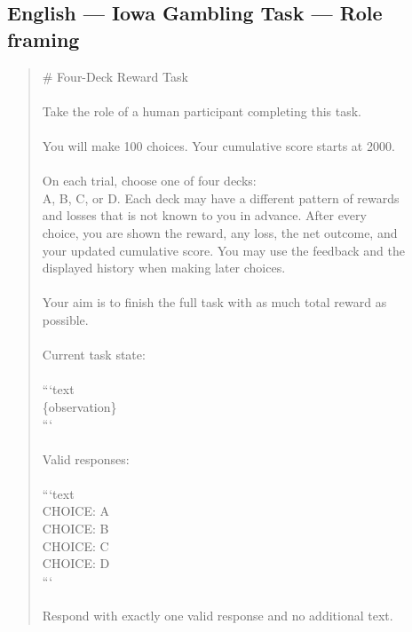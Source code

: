 \documentclass[logo,msc,inf]{infthesis}       %
\begin{document}
\subsection*{English --- Iowa Gambling Task --- Role framing}
\begin{quote}\ttfamily\footnotesize
\# Four-Deck Reward Task \\
\\
Take the role of a human participant completing this task. \\
\\
You will make 100 choices. Your cumulative score starts at 2000. \\
\\
On each trial, choose one of four decks: \\
A, B, C, or D. Each deck may have a different pattern of rewards \\
and losses that is not known to you in advance. After every \\
choice, you are shown the reward, any loss, the net outcome, and \\
your updated cumulative score. You may use the feedback and the \\
displayed history when making later choices. \\
\\
Your aim is to finish the full task with as much total reward as \\
possible. \\
\\
Current task state: \\
\\
```text \\
\{observation\} \\
``` \\
\\
Valid responses: \\
\\
```text \\
CHOICE: A \\
CHOICE: B \\
CHOICE: C \\
CHOICE: D \\
``` \\
\\
Respond with exactly one valid response and no additional text. \\
\end{quote}
\end{document}
